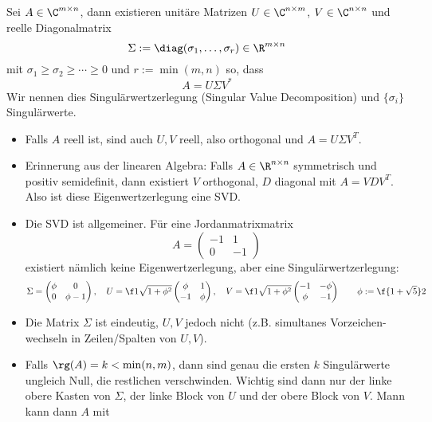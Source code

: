 \documentclass[a4paper,11pt]{scrartcl}
\begin{document}
\begin{st}
	\label{1.37}
	Sei $A\in \C^{m\times n}$, dann existieren unitäre Matrizen $U\in \C^{n\times m}$, $V\in \C^{n\times n}$ und reelle Diagonalmatrix
	\[
		\Sigma := \diag( \sigma_1, \dotsc, \sigma_r)  \in \R^{m\times n}
	\]
	mit $\sigma_1\ge \sigma_2 \ge \dotsb \ge 0$ und $r:= \min(m,n)$ so, dass
	\[
		A = U \Sigma V^*
	\]
	Wir nennen dies Singulärwertzerlegung (Singular Value Decomposition) und $\{\sigma_i\}$ Singulärwerte.
	\begin{note}
		\begin{itemize}
			\item
				Falls $A$ reell ist, sind auch $U,V$ reell, also orthogonal und $A=U\Sigma V^T$.
			\item
				Erinnerung aus der linearen Algebra:
				Falls $A \in \R^{n\times n}$ symmetrisch und positiv semidefinit, dann existiert $V$ orthogonal, $D$ diagonal mit $A=VDV^T$.
				Also ist diese Eigenwertzerlegung eine SVD.
			\item
				Die SVD ist allgemeiner.
				Für eine Jordanmatrixmatrix
				\[
					A = \begin{pmatrix}
						-1 & 1 \\
						0 & -1
					\end{pmatrix}
				\]
				existiert nämlich keine Eigenwertzerlegung, aber eine Singulärwertzerlegung:
				\[
					\Sigma = \begin{pmatrix}
						\phi & 0 \\
						0 & \phi -1
					\end{pmatrix}
					,\quad U = \f 1{\sqrt{1+\phi^2}} \begin{pmatrix}
						\phi & 1 \\
						-1 & \phi
					\end{pmatrix}
					,\quad V = \f 1{\sqrt{1+\phi^2}} \begin{pmatrix}
						-1 & -\phi \\
						\phi & - 1
					\end{pmatrix}
					 \qquad \phi := \f {1+\sqrt 5}2
				\]
			\item
				Die Matrix $\Sigma$ ist eindeutig, $U,V$ jedoch nicht (z.B. simultanes Vorzeichen-wechseln in Zeilen/Spalten von $U,V$).
			\item
				Falls $\rg(A) = k < \min(n,m)$, dann sind genau die ersten $k$ Singulärwerte ungleich Null, die restlichen verschwinden.
				Wichtig sind dann nur der linke obere Kasten von $\Sigma$, der linke Block von $U$ und der obere Block von $V$.
				Mann kann dann $A$ mit

\end{itemize}
\end{note}
\end{st}
\end{document}
